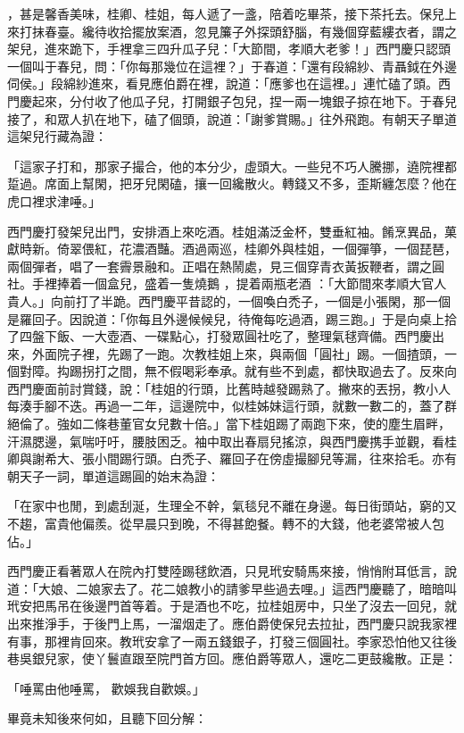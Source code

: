 ，甚是馨香美味，桂卿、桂姐，每人遞了一盞，陪着吃畢茶，接下茶托去。保兒上來打抹春臺。纔待收拾擺放案酒，忽見簾子外探頭舒腦，有幾個穿藍縷衣者，謂之架兒，進來跪下，手裡拿三四升瓜子兒：「大節間，孝順大老爹！」西門慶只認頭一個叫于春兒，問：「你每那幾位在這裡？」于春道：「還有段綿紗、青聶鉞在外邊伺侯。」段綿紗進來，看見應伯爵在裡，說道：「應爹也在這裡。」連忙磕了頭。西門慶起來，分付收了他瓜子兒，打開銀子包兒，捏一兩一塊銀子掠在地下。于春兒接了，和眾人扒在地下，磕了個頭，說道：「謝爹賞賜。」往外飛跑。有朝天子單道這架兒行藏為證：

「這家子打和，那家子撮合，他的本分少，虛頭大。一些兒不巧人騰挪，遶院裡都踅過。席面上幫閑，把牙兒閑磕，攘一回纔散火。轉錢又不多，歪斯纏怎麼？他在虎口裡求津唾。」

西門慶打發架兒出門，安排酒上來吃酒。桂姐滿泛金杯，雙垂紅袖。餚烹異品，菓獻時新。倚翠偎紅，花濃酒豔。酒過兩巡，桂卿外與桂姐，一個彈箏，一個琵琶，兩個彈者，唱了一套霽景融和。正唱在熱鬧處，見三個穿青衣黃扳鞭者，謂之圓社。手裡捧着一個盒兒，盛着一隻燒鵝 ，提着兩瓶老酒 ：「大節間來孝順大官人貴人。」向前打了半跪。西門慶平昔認的，一個喚白禿子，一個是小張閑，那一個是羅回子。因說道：「你每且外邊候候兒，待俺每吃過酒，踢三跑。」于是向桌上拾了四盤下飯、一大壺酒、一碟點心，打發眾圓社吃了，整理氣毬齊備。西門慶出來，外面院子裡，先踢了一跑。次教桂姐上來，與兩個「圓社」踢。一個揸頭，一個對障。抅踢拐打之間，無不假喝彩奉承。就有些不到處，都快取過去了。反來向西門慶面前討賞錢，說：「桂姐的行頭，比舊時越發踢熟了。撇來的丟拐，教小人每湊手腳不迭。再過一二年，這邊院中，似桂姊妹這行頭，就數一數二的，蓋了群絕倫了。強如二條巷董官女兒數十倍。」當下桂姐踢了兩跑下來，使的塵生眉畔，汗濕腮邊，氣喘吁吁，腰肢困乏。袖中取出春扇兒搖涼，與西門慶携手並觀，看桂卿與謝希大、張小間踢行頭。白禿子、羅回子在傍虛撮腳兒等漏，往來拾毛。亦有朝天子一詞，單道這踢圓的始末為證：

「在家中也閒，到處刮涎，生理全不幹，氣毯兒不離在身邊。每日街頭站，窮的又不趨，富貴他偏羨。從早晨只到晚，不得甚飽餐。轉不的大錢，他老婆常被人包佔。」

西門慶正看著眾人在院內打雙陸踢毬飲酒，只見玳安騎馬來接，悄悄附耳低言，說道：「大娘、二娘家去了。花二娘教小的請爹早些過去哩。」這西門慶聽了，暗暗叫玳安把馬吊在後邊門首等着。于是酒也不吃，拉桂姐房中，只坐了沒去一回兒，就出來推淨手，于後門上馬，一溜烟走了。應伯爵使保兒去拉扯，西門慶只說我家裡有事，那裡肯回來。教玳安拿了一兩五錢銀子，打發三個圓社。李家恐怕他又往後巷吳銀兒家，使丫鬟直跟至院門首方回。應伯爵等眾人，還吃二更鼓纔散。正是：

「唾罵由他唾罵，  歡娛我自歡娛。」

畢竟未知後來何如，且聽下回分解：

